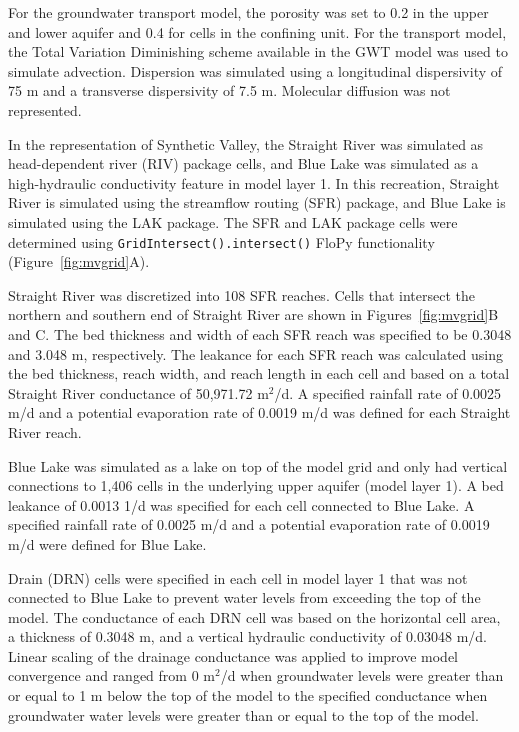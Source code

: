 \documentclass[12pt, oneside]{article}  	%
\begin{document}
For the groundwater transport model, the porosity was set to 0.2 in the upper and lower aquifer and 0.4 for cells in the confining unit. For the transport model, the Total Variation Diminishing scheme available in the GWT model \citep{modflow6gwt} was used to simulate advection. Dispersion was simulated using a longitudinal dispersivity of 75 m and a transverse dispersivity of 7.5 m. Molecular diffusion was not represented.

In the \cite{hill1998} representation of Synthetic Valley, the Straight River was simulated as head-dependent river (RIV) package cells, and Blue Lake was simulated as a high-hydraulic conductivity feature in model layer 1. In this recreation, Straight River is simulated using the streamflow routing (SFR) package, and Blue Lake is simulated using the LAK package. The SFR and LAK package cells were determined using \texttt{GridIntersect().intersect()} FloPy functionality (Figure~\ref{fig:mvgrid}A). 

Straight River was discretized into 108 SFR reaches. Cells that intersect the northern and southern end of Straight River are shown in Figures~\ref{fig:mvgrid}B and C. The bed thickness and width of each SFR reach was specified to be 0.3048 and 3.048 m, respectively. The leakance for each SFR reach was calculated using the bed thickness, reach width, and reach length in each cell and based on a total Straight River conductance of 50,971.72 m$^2$/d. A specified rainfall rate of 0.0025 m/d and a potential evaporation rate of 0.0019 m/d was defined for each Straight River reach.

Blue Lake was simulated as a lake on top of the model grid and only had vertical connections to 1,406 cells in the underlying upper aquifer (model layer 1). A bed leakance of 0.0013 1/d was specified for each cell connected to Blue Lake. A specified rainfall rate of 0.0025 m/d and a potential evaporation rate of 0.0019 m/d were defined for Blue Lake.

Drain (DRN) cells were specified in each cell in model layer 1 that was not connected to Blue Lake to prevent water levels from exceeding the top of the model. The conductance of each DRN cell was based on the horizontal cell area, a thickness of 0.3048 m, and a vertical hydraulic conductivity of 0.03048 m/d. Linear scaling of the drainage conductance was applied to improve model convergence and ranged from 0 m$^2$/d when groundwater levels were greater than or equal to 1 m below the top of the model to the specified conductance when groundwater water levels were greater than or equal to the top of the model.
\end{document}
